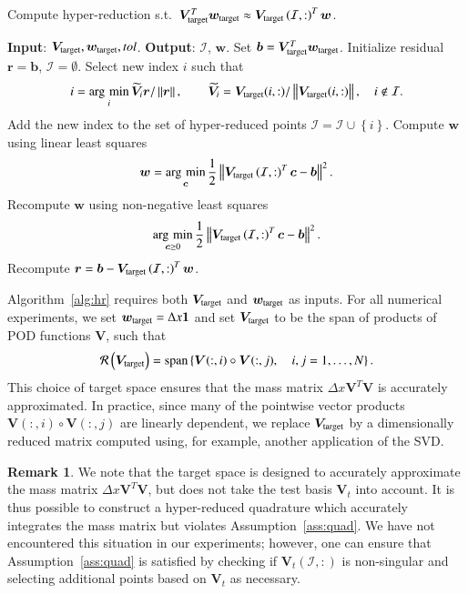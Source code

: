 \documentclass[preprint,10pt]{elsarticle}
\theoremstyle{definition}
\theoremstyle{lemma}
\newtheorem*{remark}{Remark}
\theoremstyle{theorem}
\theoremstyle{assumption}
\DeclareMathOperator*{\argmin}{\arg\,\min}
\renewcommand{\tilde}{\widetilde}
\newcommand{\nor}[1]{\left\| #1 \right\|}
\newcommand{\LRp}[1]{\left( #1 \right)}
\newcommand{\LRc}[1]{\left\{ #1 \right\}}
\begin{document}
\begin{algorithm}[!h]
\caption{Compute hyper-reduction s.t.\ $\bm{V}_{\rm target}^T\bm{w}_{\rm target} \approx \bm{V}_{\rm target}\LRp{\mathcal{I},:}^T\bm{w}$.}
\begin{algorithmic}[1]
\STATE \textbf{Input}: $\bm{V}_{\rm target}, \bm{w}_{\rm target}, tol$.
\STATE \textbf{Output}: $\mathcal{I}$, $\bm{w}$.
\STATE Set $\bm{b} = \bm{V}_{\rm target}^T\bm{w}_{\rm target}$.
\STATE Initialize residual $\bm{r} = \bm{b}$, $\mathcal{I} = \emptyset$.
\WHILE {$\nor{\bm{r}}/\nor{\bm{b}} > tol$}
        \STATE Select new index $i$ such that
        \[
        i = \argmin_i \tilde{\bm{V}}_{i}\bm{r}/\nor{\bm{r}}, \qquad
        \tilde{\bm{V}}_i = \bm{V}_{\rm target}(i,:) / \nor{\bm{V}_{\rm target}(i,:)}, \quad i \not\in \mathcal{I}.
        \]
        \STATE Add the new index to the set of hyper-reduced points $\mathcal{I} = \mathcal{I} \cup \LRc{i}$.  
        \STATE Compute $\bm{w}$ using linear least squares
        \[
        \bm{w} = \argmin_{\bm{c}} \frac{1}{2}\nor{\bm{V}_{\rm target}\LRp{\mathcal{I},:}^T\bm{c} - \bm{b}}^2.
        \]
                \STATE Recompute $\bm{w}$ using non-negative least squares 
                \[
                \argmin_{\bm{c} \geq 0} \frac{1}{2}\nor{\bm{V}_{\rm target}\LRp{\mathcal{I},:}^T\bm{c} - \bm{b}}^2.
                \]             
        \ENDIF
        \STATE Recompute $\bm{r} = \bm{b} - \bm{V}_{\rm target}\LRp{\mathcal{I},:}^T\bm{w}$.
\ENDWHILE
\end{algorithmic}
\label{alg:hr}
\end{algorithm}

Algorithm~\ref{alg:hr} requires both $\bm{V}_{\rm target}$ and $\bm{w}_{\rm target}$ as inputs. For all numerical experiments, we set $\bm{w}_{\rm target} = \Delta x \bm{1}$ and set $\bm{V}_{\rm target}$ to be the span of products of POD functions $\bm{V}$, such that
\[
\mathcal{R}\LRp{\bm{V}_{\rm target}} = {\rm span}\LRc{\bm{V}(:,i) \circ \bm{V}(:,j), \quad i,j = 1,\ldots, N}.
\]
This choice of target space ensures that the mass matrix $\Delta x \bm{V}^T\bm{V}$ is accurately approximated.  In practice, since many of the pointwise vector products $\bm{V}(:,i) \circ \bm{V}(:,j)$ are linearly dependent, we replace $\bm{V}_{\rm target}$ by a dimensionally reduced matrix computed using, for example, another application of the SVD.  %

\begin{remark}
We note that the target space is designed to accurately approximate the mass matrix $\Delta x \bm{V}^T\bm{V}$, but does not take the test basis $\bm{V}_{t}$ into account.  It is thus possible to construct a hyper-reduced quadrature which accurately integrates the mass matrix but violates Assumption~\ref{ass:quad}.  We have not encountered this situation in our experiments; however, one can ensure that Assumption~\ref{ass:quad} is satisfied by checking if $\bm{V}_t\LRp{\mathcal{I},:}$ is non-singular and selecting additional points based on $\bm{V}_t$ as necessary.  
\end{remark}
\end{document}

